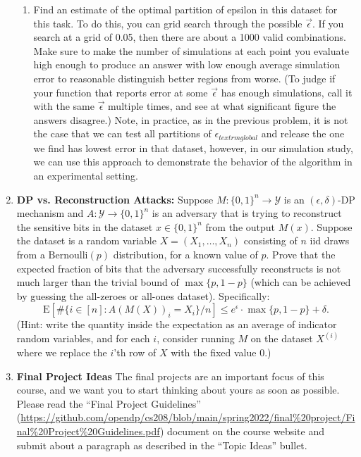\documentclass[11pt]{article}
\newcommand{\zo}{\{0,1\}}
\begin{document}
\begin{enumerate}[leftmargin=*]
\begin{enumerate}
    \item Find an estimate of the optimal partition of epsilon in this dataset for this task.  To do this, you can grid search through the possible $\Vec{\epsilon}$.  If you search at a grid of 0.05, then there are about a 1000 valid combinations.  Make sure to make the number of simulations at each point you evaluate high enough to produce an answer with low enough average simulation error to reasonable distinguish better regions from worse.  (To judge if your function that reports error at some $\Vec{\epsilon}$ has enough simulations, call it with the same $\Vec{\epsilon}$ multiple times, and see at what significant figure the answers disagree.)  Note, in practice, as in the previous problem, it is not the case that we can test all partitions of $\epsilon_{textrm{global}}$ and release the one we find has lowest error in that dataset, however, in our simulation study, we can use this approach to demonstrate the behavior of the algorithm in an experimental setting.
    \fi

\end{enumerate}

\item \textbf{DP vs. Reconstruction Attacks:}  Suppose $M : \zo^n\rightarrow \mathcal{Y}$ is an $(\epsilon,\delta)$-DP mechanism
and $A : \mathcal{Y}\rightarrow \zo^n$ is an adversary that is trying to reconstruct the sensitive bits in the dataset $x\in \zo^n$ from
the output $M(x)$.   Suppose the dataset is a random variable $X=(X_1,\ldots,X_n)$ consisting of $n$ iid draws from a $\mathrm{Bernoulli}(p)$ distribution, for a known value of $p$.   Prove that the expected fraction of bits that the adversary successfully reconstructs is not much larger than the trivial bound of $\max\{p,1-p\}$ (which can be achieved by guessing the all-zeroes or all-ones dataset).  Specifically:
$$\mathrm{E}\left[\#\{ i\in [n] : A(M(X))_i=X_i\}/n\right]\leq e^{\epsilon} \cdot \max\{p,1-p\}+\delta.$$
(Hint: write the quantity inside the expectation
as an average of indicator random variables, and for each
$i$, consider running $M$ on the dataset $X^{(i)}$ where
we replace the $i$'th row of $X$ with the fixed value 0.)



\item \textbf{Final Project Ideas} 
The final projects are an important focus of this course, and we want you to start thinking about yours as soon as possible.  Please read the
``Final Project Guidelines'' (\url{https://github.com/opendp/cs208/blob/main/spring2022/final%20project/Final%20Project%20Guidelines.pdf}) 
document on the course website and
submit about a paragraph as described in the ``Topic Ideas'' bullet.


\end{enumerate}
\end{document}
